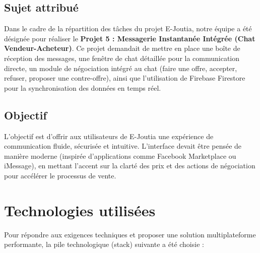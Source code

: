 \documentclass[12pt,a4paper]{report}
\begin{document}
\section{Sujet attribué}
Dans le cadre de la répartition des tâches du projet E-Joutia, notre équipe a été désignée pour réaliser le \textbf{Projet 5 : Messagerie Instantanée Intégrée (Chat Vendeur-Acheteur)}. 
Ce projet demandait de mettre en place une boîte de réception des messages, une fenêtre de chat détaillée pour la communication directe, un module de négociation intégré au chat (faire une offre, accepter, refuser, proposer une contre-offre), ainsi que l'utilisation de Firebase Firestore pour la synchronisation des données en temps réel.

\section{Objectif}
L'objectif est d'offrir aux utilisateurs de E-Joutia une expérience de communication fluide, sécurisée et intuitive. L'interface devait être pensée de manière moderne (inspirée d'applications comme Facebook Marketplace ou iMessage), en mettant l'accent sur la clarté des prix et des actions de négociation pour accélérer le processus de vente.

\chapter{Technologies utilisées}

Pour répondre aux exigences techniques et proposer une solution multiplateforme performante, la pile technologique (stack) suivante a été choisie :
\end{document}
